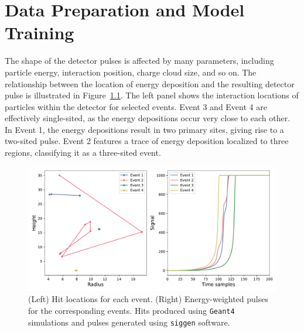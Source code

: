 \chapter{Data Preparation and Model Training}
\label{chap:training}
The shape of the detector pulses is affected by many parameters, including particle energy, interaction position, charge cloud size, and so on. The relationship between the location of energy deposition and the resulting detector pulse is illustrated in Figure~\ref{fig:eng_dep_sim}. The left panel shows the interaction locations of particles within the detector for selected events. Event 3 and Event 4 are effectively single-sited, as the energy depositions occur very close to each other. In Event 1, the energy depositions result in two primary sites, giving rise to a two-sited pulse. Event 2 features a trace of energy deposition localized to three regions, classifying it as a three-sited event. 

\begin{figure}[htb!]
    \includegraphics[width=0.99\linewidth,trim={1pc 0pc 1pc 0pc},clip]{ch6/figs/hits_and_pulses.pdf}
    \caption{(Left) Hit locations for each event. (Right) Energy-weighted pulses for the corresponding events. Hits produced using \texttt{Geant4} simulations and pulses generated using \texttt{siggen} software.}
   \label{fig:eng_dep_sim}
\end{figure}

